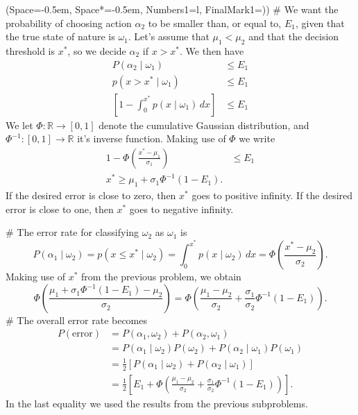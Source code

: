 \documentclass[12pt, a4paper]{article}
\newcommand{\listSpace}{-0.5em}%
\newcommand{\R}{\mathbb{R}}
\begin{document}
\begin{easylist}[enumerate]
\ListProperties(Space=\listSpace, Space*=\listSpace, Numbers1=l, FinalMark1={)})
# We want the probability of choosing action $\alpha_2$ to be smaller than, or equal to, $E_1$, given that the true state of nature is $\omega_1$.
Let's assume that $\mu_1 < \mu_2$ and that the decision threshold is $x^*$, so we decide $\alpha_2$ if $x > x^*$.
We then have
\begin{align*}
	P(\alpha_2  \mid  \omega_1) &\leq E_1 \\
	p(x > x^*  \mid  \omega_1) &\leq E_1 \\
	\left[1 - \int_{0}^{x^*} p(x  \mid  \omega_1)  \, dx \right] &\leq E_1
\end{align*}
We let $\Phi: \R \to \left[0, 1\right]$ denote the cumulative Gaussian distribution, and $\Phi^{-1}: \left[0, 1\right] \to \R$ it's inverse function.
Making use of $\Phi$ we write
\begin{align*}
1 - \Phi \left( \frac{x^* - \mu_1}{\sigma_1} \right) &\leq E_1 \\
x^* \geq \mu_1 + \sigma_1 \Phi^{-1} \left(1 - E_1 \right).
\end{align*}
If the desired error is close to zero, then $x^*$ goes to positive infinity.
If the desired error is close to one, then $x^*$ goes to negative infinity.

# The error rate for classifying $\omega_2$ as $\omega_1$ is
\begin{equation*}
	P(\alpha_1  \mid  \omega_2) = 	p(x \leq x^*  \mid  \omega_2) = \int_{0}^{x^*} p(x \mid  \omega_2) \, dx 
	= 
	\Phi \left(  \frac{x^* - \mu_2}{\sigma_2}  \right).
\end{equation*}
Making use of $x^*$ from the previous problem, we obtain
\begin{equation*}
 \Phi \left(  \frac{ \mu_1 + \sigma_1 \Phi^{-1} \left(1 - E_1 \right) - \mu_2}{\sigma_2}  \right) 
 =
\Phi \left(  \frac{\mu_1 - \mu_2}{\sigma_2} + \frac{\sigma_1}{\sigma_2}  \Phi^{-1} \left(1 - E_1 \right) \right).
\end{equation*}
# The overall error rate becomes
\begin{align*}
	P(\text{error}) &= P(\alpha_1, \omega_2) + P(\alpha_2, \omega_1) \\
	&= P(\alpha_1  \mid  \omega_2) P(\omega_2) + P(\alpha_2 \mid  \omega_1) P(\omega_1) \\
	&= \frac{1}{2} \left[  P(\alpha_1  \mid  \omega_2) +  P(\alpha_2 \mid  \omega_1) \right] \\
	&= \frac{1}{2} \left[ E_1 +  \Phi \left(  \frac{\mu_1 - \mu_2}{\sigma_2} + \frac{\sigma_1}{\sigma_2}  \Phi^{-1} \left(1 - E_1 \right) \right) \right].
\end{align*}
In the last equality we used the results from the previous subproblems.


\end{easylist}
\end{document}
